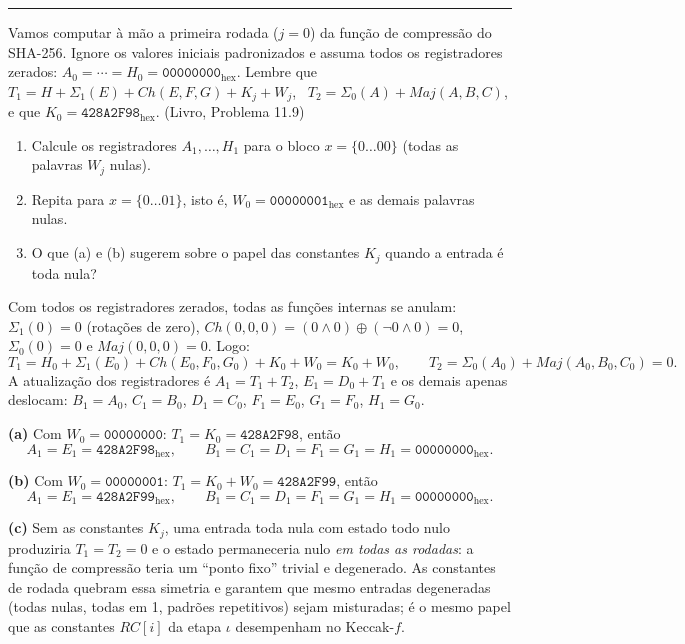 \documentclass[11pt,a4paper]{article}
\newcommand{\livro}[1]{{\footnotesize\color{black!50}(Livro, Problema #1)}}
\newcommand{\exercicio}[1]{%
    \Needspace{8\baselineskip}%
    \par\vspace{1.2em}
    \noindent
    {\color{black!55}\rule[-0.25em]{3pt}{1.6em}}%
    \hspace{0.6em}{\Large\bfseries Exerc\'{i}cio #1}
    \par\vspace{-0.4em}
    \noindent{\color{black!35}\rule{\textwidth}{0.4pt}}
    \par\vspace{0.35em}
}
\newenvironment{resposta}{%
    \begin{respostabox}
    \color{red!70!black}\sloppy
}{%
    \end{respostabox}
}
\begin{document}
\exercicio{3}
Vamos computar \`{a} m\~{a}o a primeira rodada ($j = 0$) da fun\c{c}\~{a}o de compress\~{a}o do SHA-256. Ignore os valores iniciais padronizados e assuma todos os registradores zerados: $A_0 = \cdots = H_0 = \texttt{00000000}_{\text{hex}}$. Lembre que $T_1 = H + \Sigma_1(E) + Ch(E,F,G) + K_j + W_j$, \ $T_2 = \Sigma_0(A) + Maj(A,B,C)$, e que $K_0 = \texttt{428A2F98}_{\text{hex}}$. \livro{11.9}
\begin{enumerate}[label=(\alph*)]
    \item Calcule os registradores $A_1, \dots, H_1$ para o bloco $x = \{0\dots00\}$ (todas as palavras $W_j$ nulas).
    \item Repita para $x = \{0\dots01\}$, isto \'{e}, $W_0 = \texttt{00000001}_{\text{hex}}$ e as demais palavras nulas.
    \item O que (a) e (b) sugerem sobre o papel das constantes $K_j$ quando a entrada \'{e} toda nula?
\end{enumerate}

\begin{resposta}
Com todos os registradores zerados, todas as fun\c{c}\~{o}es internas se anulam: $\Sigma_1(0) = 0$ (rota\c{c}\~{o}es de zero), $Ch(0,0,0) = (0 \wedge 0) \oplus (\lnot 0 \wedge 0) = 0$, $\Sigma_0(0) = 0$ e $Maj(0,0,0) = 0$. Logo:
\[
    T_1 = H_0 + \Sigma_1(E_0) + Ch(E_0,F_0,G_0) + K_0 + W_0 = K_0 + W_0,
    \qquad T_2 = \Sigma_0(A_0) + Maj(A_0,B_0,C_0) = 0.
\]
A atualiza\c{c}\~{a}o dos registradores \'{e} $A_1 = T_1 + T_2$, $E_1 = D_0 + T_1$ e os demais apenas deslocam: $B_1 = A_0$, $C_1 = B_0$, $D_1 = C_0$, $F_1 = E_0$, $G_1 = F_0$, $H_1 = G_0$.

\textbf{(a)} Com $W_0 = \texttt{00000000}$: \quad $T_1 = K_0 = \texttt{428A2F98}$, ent\~{a}o
\[
    A_1 = E_1 = \texttt{428A2F98}_{\text{hex}}, \qquad B_1 = C_1 = D_1 = F_1 = G_1 = H_1 = \texttt{00000000}_{\text{hex}}.
\]

\textbf{(b)} Com $W_0 = \texttt{00000001}$: \quad $T_1 = K_0 + W_0 = \texttt{428A2F99}$, ent\~{a}o
\[
    A_1 = E_1 = \texttt{428A2F99}_{\text{hex}}, \qquad B_1 = C_1 = D_1 = F_1 = G_1 = H_1 = \texttt{00000000}_{\text{hex}}.
\]

\textbf{(c)} Sem as constantes $K_j$, uma entrada toda nula com estado todo nulo produziria $T_1 = T_2 = 0$ e o estado permaneceria nulo \emph{em todas as rodadas}: a fun\c{c}\~{a}o de compress\~{a}o teria um ``ponto fixo'' trivial e degenerado. As constantes de rodada quebram essa simetria e garantem que mesmo entradas degeneradas (todas nulas, todas em 1, padr\~{o}es repetitivos) sejam misturadas; \'{e} o mesmo papel que as constantes $RC[i]$ da etapa $\iota$ desempenham no Keccak-$f$.
\end{resposta}
\end{document}
